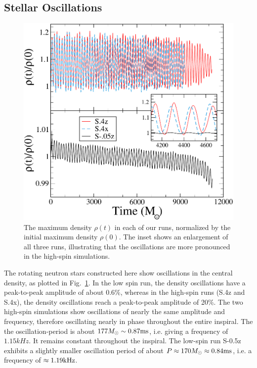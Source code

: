 \documentclass[aps,prd,amsmath,floatfix
,twocolumn
,superscriptaddress,nofootinbib,showpacs]{revtex4-1}
\theoremstyle{plain} \newtheorem{thm}{Theorem} \newtheorem{lem}{Lemma}
\begin{document}





\subsection{Stellar Oscillations}
\label{sec:QNModes}

\begin{figure}
\includegraphics[width=0.95\columnwidth]{RhoMax}
\caption{\label{fig:RhoMax} The maximum density $\rho(t)$ in each of
  our runs, normalized by the initial maximum density $\rho(0)$.  The
  inset shows an enlargement of all three runs, illustrating that the
  oscillations are more pronounced in the high-spin simulations. }
\end{figure}

The rotating neutron stars constructed here show oscillations in the
central density, as plotted in Fig.~\ref{fig:RhoMax}.  In the low spin
run, the density oscillations have a peak-to-peak amplitude of about
0.6\%, whereas in the high-spin runs (S.4z and S.4x), the density
oscillations reach a peak-to-peak amplitude of 20\%.  The two
high-spin simulations show oscillations of nearly the same amplitude
and frequency, therefore oscillating nearly in phase throughout the
entire inspiral.  The the oscillation-period is about
$177 M_{\odot} \sim 0.87\rm{ms}$, i.e. giving a frequency of
$1.15kHz$.  It remains constant throughout the inspiral.  The low-spin
run S-0.5z exhibits a slightly smaller oscillation period of about
$P\approx 170M_{\odot}\approx 0.84\rm{ms}$, i.e. a frequency of
$\approx 1.19{\rm kHz}$.  
\end{document}
